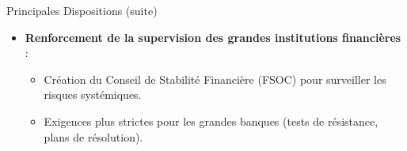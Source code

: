 \begin{frame}{Principales Dispositions (suite)}
    \begin{itemize}
        \item \textbf{Renforcement de la supervision des grandes institutions financières} :
            \begin{itemize}
                \item Création du Conseil de Stabilité Financière (FSOC) pour surveiller les risques systémiques.
                \item Exigences plus strictes pour les grandes banques (tests de résistance, plans de résolution).
            \end{itemize}
    \end{itemize}
\end{frame}